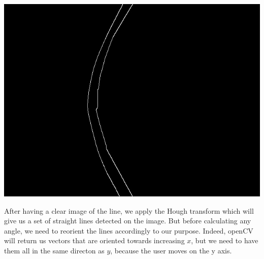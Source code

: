\documentclass{rapport}
\begin{document}
\begin{center}
\includegraphics[width=0.35\linewidth]{canny_edge.jpg}
\end{center}
After having a clear image of the line, we apply the Hough transform which will give us a set of straight lines detected on the image. But before calculating any angle, we need to reorient the lines accordingly to our purpose. Indeed, openCV will return us vectors that are oriented towards increasing \(x\), but we need to have them all in the same directon as \(y\), because the user moves on the y axis.
\end{document}
